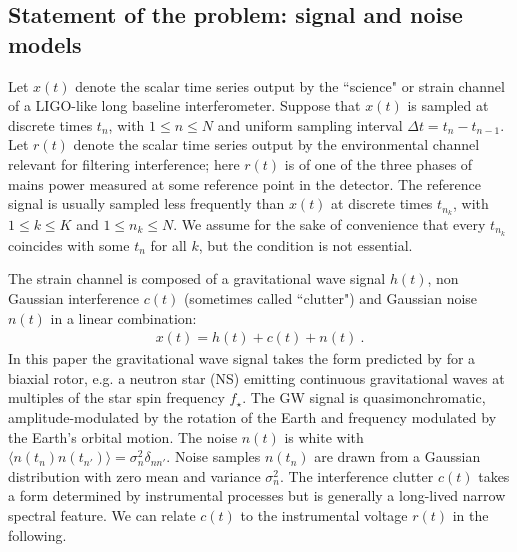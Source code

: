 \documentclass[pra,superscriptaddress,reprint,amsmath,amssymb,nofootinbib]{revtex4-2}
\begin{document}
\subsection{Statement of the problem: signal and noise models}  \label{sec21}
Let $x(t)$ denote the scalar time series output by the ``science" or strain channel of a LIGO-like long baseline interferometer. Suppose that $x(t)$ is sampled at discrete times $t_n$, with $1 \leq n \leq N$ and uniform sampling interval $\Delta t = t_n - t_{n-1}$. Let $r(t)$ denote the scalar time series output by the environmental channel relevant for filtering interference; here $r(t)$ is of one of the three phases of mains power measured at some reference point in the detector. The reference signal is usually sampled less frequently than $x(t)$ at discrete times $t_{n_k}$, with $1 \leq k \leq K$ and $1 \leq n_k \leq N$. We assume for the sake of convenience that every $t_{n_k}$ coincides with some $t_n$ for all $k$, but the condition is not essential. \newline 

The strain channel is composed of a gravitational wave signal $h(t)$, non Gaussian interference $c(t)$ (sometimes called ``clutter") and Gaussian noise $n(t)$ in a linear combination:
\begin{eqnarray}
	x(t) = h(t) + c(t) + n(t) \ .
	\label{eq:data}
\end{eqnarray}
 In this paper the gravitational wave signal takes the form predicted by \citet{Jaranowski1998} for a biaxial rotor, e.g. a neutron star (NS) emitting continuous gravitational waves at multiples of the star spin frequency $f_{\star}$. The GW signal is quasimonchromatic, amplitude-modulated by the rotation of the Earth and frequency modulated by the Earth's orbital motion. The noise $n(t)$ is white with $\langle n(t_n) n(t_{n'})\rangle = \sigma_n^2 \delta_{n n'}$. Noise samples $n(t_n)$ are drawn from a Gaussian distribution with zero mean and variance $\sigma_n^2$. The interference clutter $c(t)$ takes a form determined by instrumental processes but is generally a long-lived narrow spectral feature. We can relate $c(t)$ to the instrumental voltage $r(t)$ in the following. \newline 
 
\end{document}
